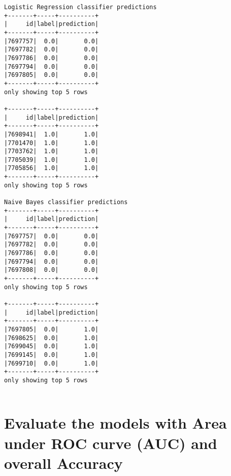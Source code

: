 \documentclass{report}
\begin{document}
    \begin{Verbatim}[commandchars=\\\{\}]
Logistic Regression classifier predictions
+-------+-----+----------+
|     id|label|prediction|
+-------+-----+----------+
|7697757|  0.0|       0.0|
|7697782|  0.0|       0.0|
|7697786|  0.0|       0.0|
|7697794|  0.0|       0.0|
|7697805|  0.0|       0.0|
+-------+-----+----------+
only showing top 5 rows

+-------+-----+----------+
|     id|label|prediction|
+-------+-----+----------+
|7698941|  1.0|       1.0|
|7701470|  1.0|       1.0|
|7703762|  1.0|       1.0|
|7705039|  1.0|       1.0|
|7705856|  1.0|       1.0|
+-------+-----+----------+
only showing top 5 rows

Naive Bayes classifier predictions
+-------+-----+----------+
|     id|label|prediction|
+-------+-----+----------+
|7697757|  0.0|       0.0|
|7697782|  0.0|       0.0|
|7697786|  0.0|       0.0|
|7697794|  0.0|       0.0|
|7697808|  0.0|       0.0|
+-------+-----+----------+
only showing top 5 rows

+-------+-----+----------+
|     id|label|prediction|
+-------+-----+----------+
|7697805|  0.0|       1.0|
|7698625|  0.0|       1.0|
|7699045|  0.0|       1.0|
|7699145|  0.0|       1.0|
|7699710|  0.0|       1.0|
+-------+-----+----------+
only showing top 5 rows


    \end{Verbatim}

\section{Evaluate the models with Area under ROC curve (AUC) and overall
Accuracy}\label{evaluate-the-models-with-area-under-roc-curve-auc-and-overall-accuracy}
\end{document}
